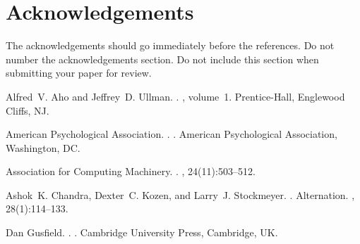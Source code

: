 \documentclass[11pt]{article}
\begin{document}
\section*{Acknowledgements}

The acknowledgements should go immediately before the references.  Do
not number the acknowledgements section. Do not include this section
when submitting your paper for review.

%
%

\begin{thebibliography}{}

Alfred~V. Aho and Jeffrey~D. Ullman.
.
, volume~1.
\newblock Prentice-{Hall}, Englewood Cliffs, NJ.

{American Psychological Association}.
.
.
\newblock American Psychological Association, Washington, DC.

{Association for Computing Machinery}.
.
, 24(11):503--512.

Ashok~K. Chandra, Dexter~C. Kozen, and Larry~J. Stockmeyer.
.
\newblock Alternation.
,
  28(1):114--133.

Dan Gusfield.
.
.
\newblock Cambridge University Press, Cambridge, UK.

\end{thebibliography}
\end{document}
